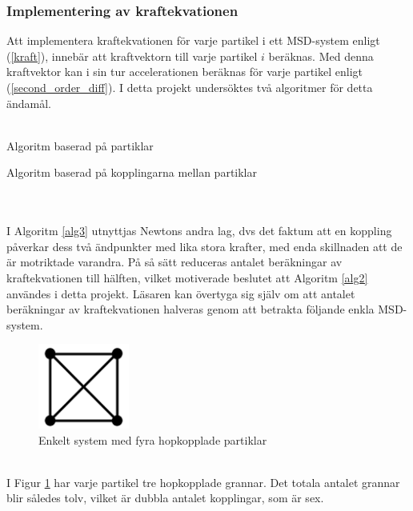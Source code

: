 \documentclass[a4paper,12pt,oneside,final,swedish]{extarticle}
\begin{document}
\subsubsection{Implementering av kraftekvationen}
Att implementera kraftekvationen för varje partikel i ett MSD-system enligt (\ref{kraft}), innebär att kraftvektorn till varje partikel $i$ beräknas. Med denna kraftvektor kan i sin tur accelerationen beräknas för varje partikel enligt (\ref{second_order_diff}). I detta projekt undersöktes två algoritmer för detta ändamål.\\\\
\begin{algorithm}[H]
\caption{Algoritm baserad på partiklar\label{alg2}}
\end{algorithm}
\begin{algorithm}[H]
\caption{Algoritm baserad på kopplingarna mellan partiklar\label{alg3}}
\end{algorithm}
\noindent \\\\I Algoritm \ref{alg3} utnyttjas Newtons andra lag, dvs det faktum att en koppling påverkar dess två ändpunkter med lika stora krafter, med enda skillnaden att de är motriktade varandra. På så sätt reduceras antalet beräkningar av kraftekvationen till hälften, vilket motiverade beslutet att Algoritm \ref{alg2} användes i detta projekt. Läsaren kan övertyga sig själv om att antalet beräkningar av kraftekvationen halveras genom att betrakta följande enkla MSD-system.
\begin{figure}[h!]
  \begin{center}
    \includegraphics[width=3cm]{Bilder/2D_2x2.png} 
  \end{center}
  \caption{Enkelt system med fyra hopkopplade partiklar}
  \label{enkelfyra::nonfloat}
\end{figure}
\\I Figur \ref{enkelfyra::nonfloat} har varje partikel tre hopkopplade grannar. Det totala antalet grannar blir således tolv, vilket är dubbla antalet kopplingar, som är sex.
\end{document}
